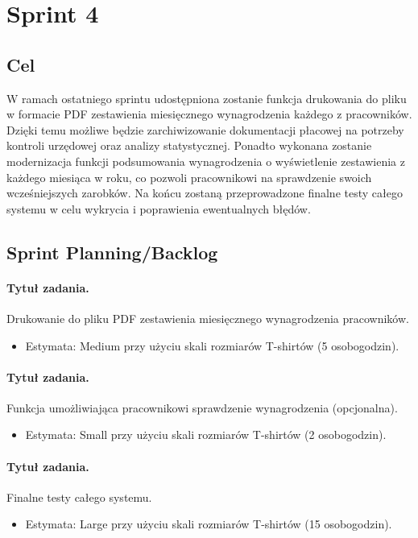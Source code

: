 \documentclass[a4paper]{article}
\begin{document}
\section{Sprint 4}

\subsection{Cel} W ramach ostatniego sprintu udostępniona zostanie funkcja drukowania do pliku w formacie PDF zestawienia miesięcznego wynagrodzenia każdego z pracowników. Dzięki temu możliwe będzie zarchiwizowanie dokumentacji płacowej na potrzeby kontroli urzędowej oraz analizy statystycznej. Ponadto wykonana zostanie modernizacja funkcji podsumowania wynagrodzenia o wyświetlenie zestawienia z każdego miesiąca w roku, co pozwoli pracownikowi na sprawdzenie swoich wcześniejszych zarobków. Na końcu zostaną przeprowadzone finalne testy całego systemu w celu wykrycia i poprawienia ewentualnych błędów.  

\subsection{Sprint Planning/Backlog}

\paragraph{Tytuł zadania.} Drukowanie do pliku PDF zestawienia miesięcznego wynagrodzenia pracowników.
\begin{itemize}
	\item Estymata: Medium przy użyciu skali rozmiarów T-shirtów (5 osobogodzin).
\end{itemize}

\paragraph{Tytuł zadania.} Funkcja umożliwiająca pracownikowi sprawdzenie wynagrodzenia (opcjonalna).
\begin{itemize}
	\item Estymata: Small przy użyciu skali rozmiarów T-shirtów (2 osobogodzin).
\end{itemize}

\paragraph{Tytuł zadania.} Finalne testy całego systemu.
\begin{itemize}
	\item Estymata: Large przy użyciu skali rozmiarów T-shirtów (15 osobogodzin).
\end{itemize}
\end{document}

